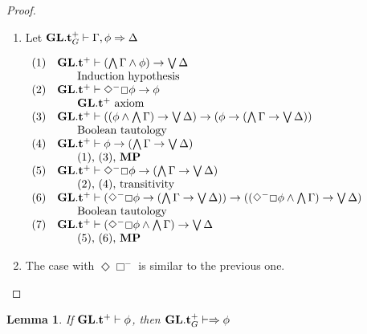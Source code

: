 \documentclass[a4paper]{article}
\theoremstyle{defin}
\theoremstyle{theorem}
\theoremstyle{prop}
\theoremstyle{lemma}
\newtheorem{lemma}{Lemma}
\theoremstyle{ex}
\theoremstyle{col}
\newcommand{\BoxM}{\Box^{-}}
\newcommand{\DiamondM}{\Diamond^{-}}
\begin{document}
\begin{proof}
  \begin{enumerate}
    \item Let ${\bf GL}.{\bf t}^{+}_{G} \vdash \Gamma, \phi \Rightarrow \Delta$
$ $

    $\begin{array}{lll}
    (1) & {\bf GL}.{\bf t}^{+} \vdash (\bigwedge \Gamma \land \phi) \rightarrow \bigvee \Delta& \\
    & \:\:\:\:\:\:\:\: \text{Induction hypothesis}& \\
    (2) & {\bf GL}.{\bf t}^{+} \vdash \DiamondM \Box \phi \to \phi& \\
    & \:\:\:\:\:\:\:\: \text{${\bf GL}.{\bf t}^{+}$ axiom}& \\
    (3) & {\bf GL}.{\bf t}^{+} \vdash ((\phi \land \bigwedge \Gamma) \to \bigvee \Delta) \to (\phi \to (\bigwedge \Gamma \to \bigvee \Delta))& \\
    & \:\:\:\:\:\:\:\: \text{Boolean tautology}& \\
    (4) & {\bf GL}.{\bf t}^{+} \vdash \phi \to (\bigwedge \Gamma \to \bigvee \Delta)& \\
    & \:\:\:\:\:\:\:\: \text{(1), (3), {\bf MP}}& \\
    (5) & {\bf GL}.{\bf t}^{+} \vdash \DiamondM \Box \phi \to (\bigwedge \Gamma \to \bigvee \Delta)& \\
    & \:\:\:\:\:\:\:\: \text{(2), (4), transitivity}& \\
    (6) & {\bf GL}.{\bf t}^{+} \vdash (\DiamondM \Box \phi \to (\bigwedge \Gamma \to \bigvee \Delta)) \to ((\DiamondM \Box \phi \land \bigwedge \Gamma) \to \bigvee \Delta)& \\
    & \:\:\:\:\:\:\:\: \text{Boolean tautology}& \\
    (7) & {\bf GL}.{\bf t}^{+} \vdash (\DiamondM \Box \phi \land \bigwedge \Gamma) \to \bigvee \Delta & \\
    & \:\:\:\:\:\:\:\: \text{(5), (6), {\bf MP}}& \\
    \end{array}$

    \item The case with $\Diamond \BoxM$ is similar to the previous one.
  \end{enumerate}
\end{proof}

\begin{lemma}
  If ${\bf GL}.{\bf t}^{+} \vdash \phi$, then ${\bf GL}.{\bf t}^{+}_{G} \vdash \Rightarrow \phi$
\end{lemma}
\end{document}
